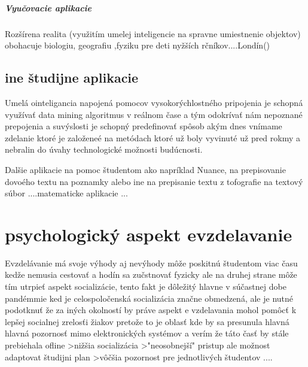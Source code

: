 \documentclass[10pt,oneside,slovak,a4paper]{article}
\begin{document}


\subparagraph{Vyučovacie aplikacie}

Rozšírena realita  (využitím umelej inteligencie na spravne umiestnenie objektov) obohacuje biologiu, geografiu ,fyziku pre deti nyžších rčníkov....Londín()
\cite{AI}
\subsection{ine študijne aplikacie}
Umelá ointeligancia napojená pomocov vysokorýchlostného pripojenia je schopná využívať data mining algoritmus v reálnom čase a tým odokrívať nám nepoznané prepojenia a suvýslosti je schopný predefinovať spôsob akým dnes vnímame zdelanie ktoré je založeneé na metódach ktoré už boly vyvinuté už pred rokmy a nebralin  do úvahy technologické možnosti budúcnosti.


Dalšie aplikacie na pomoc študentom ako napríklad Nuance, na prepisovanie dovoého textu na poznamky alebo ine na prepisanie textu z tofografie na textový súbor ....matematicke aplikacie ...




\section{psychologický aspekt evzdelavanie }
Evzdelávanie má svoje výhody aj nevýhody môže poskitnú študentom viac času kedže nemusia cestovať a hodín sa zučstnovať fyzicky ale na druhej strane môže tím utrpieť aspekt socializácie, tento fakt je dôležitý hlavne v súčastnej dobe pandémmie ked je celospoločenská socializácia značne obmedzená, ale je nutné podotknuť že za iných okolností by práve aspekt e vzdelavania mohol pomôcť k lepšej socialnej zrelosťi žiakov pretože to je oblasť kde by sa presunula hlavná hlavná pozornosť mimo elektronických systémov a verím že táto časť by stále prebiehala ofline 
>nižšia socializácia 
>"neosobnejší" pristup ale možnost adaptovat študijni plan 
>vôčšia pozornost pre jednotlivých študentov ....
\end{document}
